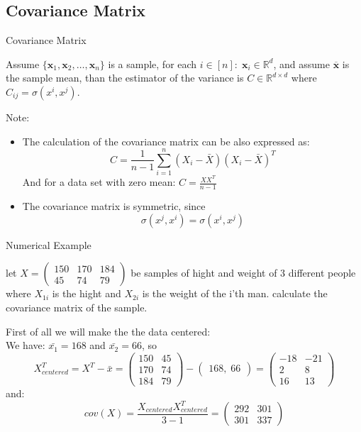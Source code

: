 \documentclass[11pt, usenames, dvipsnames]{beamer}
\begin{document}
\subsection{Covariance Matrix}
\begin{frame}{Covariance Matrix}
\begin{definition}
    Assume $\{\textbf{x}_{1},\textbf{x}_{2},\ldots ,\textbf{x}_{n}\}$ is a sample, for each $i\in[n]:\; \textbf{x}_i\in\mathbb{R}^d$, and assume ${\overline {\textbf{x}}}$ is the sample mean, than the estimator of the variance is $C\in\mathbb{R}^{d\times d}$ where $C_{ij}=\sigma\left(x^{i},x^{j}\right)$.
\end{definition}
\pause
Note: 
\begin{itemize}
    \item The calculation of the covariance matrix can be also expressed as:
$$C = \frac{1}{n-1} \sum^{n}_{i=1}{(X_i-\bar{X})(X_i-\bar{X})^T}$$
And for a data set with zero mean: $C = \frac{XX^T}{n-1}$
    \pause
    \item The covariance matrix is symmetric, since $$\sigma\left(x^{j},x^{i}\right)=\sigma\left(x^{i},x^{j}\right)$$
\end{itemize}
\end{frame}

\begingroup
\small%
\begin{frame}{Numerical Example}
\begin{exercise}
let $X=\left(\begin{array}{ccc}
150 & 170 & 184\\
45 & 74 & 79
\end{array}\right)$ be samples of hight and weight of 3 different people where $X_{1i}$ is the hight and $X_{2i}$ is the weight of the i'th man. calculate the covariance matrix of the sample.
\end{exercise}
\pause
First of all we will make the the data centered:\\
We have: $\bar{x_1}=168$ and $\bar{x_2}=66$, so $$X_{centered}^{T}=X^T-\bar{x}=\left(\begin{array}{cc}
150 & 45\\
170 & 74\\
184 & 79
\end{array}\right)-\left(\begin{array}{c}
168,\;66\end{array}\right)=\left(\begin{array}{cc}
-18 & -21\\
2 & 8\\
16 & 13
\end{array}\right)$$
\pause
and: 
$$
cov(X)=\frac{X_{centered}X_{centered}^{T}}{3-1}=\left(\begin{array}{cc}
292 & 301\\
301 & 337
\end{array}\right)
$$
\end{frame}
\endgroup
\end{document}

